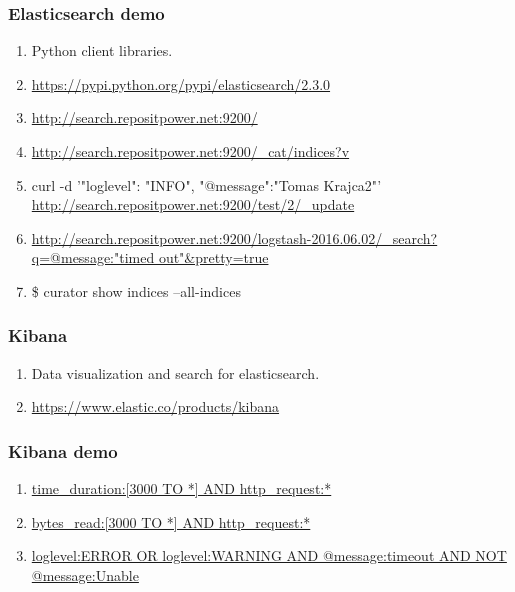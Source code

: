 \documentclass[13pt, ignorenonframetext]{beamer}
\begin{document}
\begin{frame}
\frametitle{Elasticsearch demo}
\begin{enumerate}
\item Python client libraries. 
\item \url{https://pypi.python.org/pypi/elasticsearch/2.3.0}
\item \url{http://search.repositpower.net:9200/}
\item \url{http://search.repositpower.net:9200/\_cat/indices?v}
\item curl -d '{"loglevel": "INFO", "@message":"Tomas Krajca2"}' \url{http://search.repositpower.net:9200/test/2/\_update}
\item \url{http://search.repositpower.net:9200/logstash-2016.06.02/\_search?q=@message:"timed out"\&pretty=true}
\item \$ curator show indices --all-indices
\end{enumerate}
\end{frame}

\begin{frame}
\frametitle{Kibana}
\begin{enumerate}
\item Data visualization and search for elasticsearch.
\item \url{https://www.elastic.co/products/kibana}
\end{enumerate}
\end{frame}


\begin{frame}
\frametitle{Kibana demo}
\begin{enumerate}
\item \url{time\_duration:[3000 TO *] AND http\_request:*}
\item \url{bytes\_read:[3000 TO *] AND http\_request:*}
\item \url{loglevel:ERROR OR loglevel:WARNING AND @message:timeout AND NOT @message:Unable}
\end{enumerate}
\end{frame}
\end{document}
